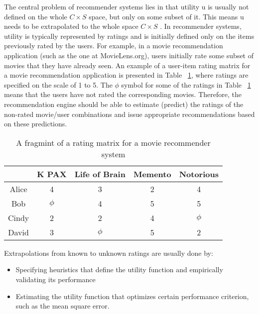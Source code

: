 The central problem of recommender systems lies in that utility u is usually not defined on the whole $C \times S$ space, but only on some subset of it. This means u needs to be extrapolated to the whole space $C \times S$ . In recommender systems, utility is typically represented by ratings and is initially defined only on the items previously rated by the users. For example, in a movie recommendation application (such as the one at MovieLens.org), users initially rate some subset of movies that they have already seen. An example of a user-item rating matrix for a movie recommendation application is presented in Table ~\ref{table:1}, where ratings are specified on the scale of 1 to 5. The $\phi$ symbol for some of the ratings in Table ~\ref{table:1} means that the users have not rated the corresponding movies. Therefore, the recommendation engine should be able to estimate (predict) the ratings of the non-rated movie/user combinations and issue appropriate recommendations based on these predictions.

\begin{table}[ht]
\caption{A fragmint of a rating matrix for a movie recommender system} %
\centering  %
\begin{tabular}{c c c c c} %
\hline\hline                        %
 & K PAX & Life of Brain & Memento & Notorious\\ [0.5ex] %
\hline                  %
Alice & 4 & 3& 2 &4  \\ %
Bob & $\phi$ & 4 & 5 &5  \\
Cindy & 2 & 2  & 4 &$\phi$  \\
David & 3 & $\phi$& 5 &2 \\[1ex]      %
\hline %
\end{tabular}
\label{table:1} %
\end{table}


Extrapolations from known to unknown ratings are usually done by:
\begin{itemize}
\item Specifying heuristics that define the utility function and empirically validating its performance
\item Estimating the utility function that optimizes certain performance criterion, such as the mean square error.
\end{itemize}

